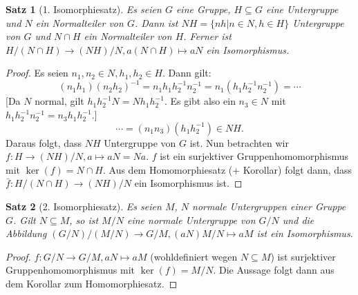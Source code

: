 \documentclass[12pt]{scrartcl} %
\newtheorem{thm}{Satz}[section]
\theoremstyle{definition}
\theoremstyle{remark}
\begin{document}
\begin{thm}[1. Isomorphiesatz]
	Es seien $G$ eine Gruppe, $H \subseteq G$ eine Untergruppe und $N$ ein Normalteiler von $G$.
	Dann ist $NH = \{nh | n \in N, h \in H\}$ Untergruppe von $G$ und $N \cap H$ ein Normalteiler von $H$.
	Ferner ist $H/(N \cap H) \rightarrow (NH)/N, a(N \cap H) \mapsto aN$ ein Isomorphismus.
\end{thm}

\begin{proof}
	Es seien $n_1, n_2 \in N, h_1, h_2 \in H$. Dann gilt:
	$$ (n_1h_1)(n_2h_2)^{-1} = n_1h_1h_2^{-1}n_2^{-1} = n_1(h_1h_2^{-1}n_2^{-1}) = \dotsb $$
	[Da $N$ normal, gilt $h_1h_2^{-1}N = Nh_1h_2^{-1}$.
	Es gibt also ein $n_3 \in N$ mit $h_1h_2^{-1}n_2^{-1} = n_3h_1h_2^{-1}$.]
	$$ \dotsb = (n_1n_3)(h_1h_2^{-1}) \in NH.$$
	Daraus folgt, dass $NH$ Untergruppe von $G$ ist.
	Nun betrachten wir $f: H \rightarrow (NH)/N, a \mapsto aN = Na$.
	$f$ ist ein surjektiver Gruppenhomomorphismus mit $\ker(f) = N \cap H$.
	Aus dem Homomorphiesatz (+ Korollar) folgt dann, dass $\bar{f}: H/(N \cap H) \rightarrow (NH)/N$ ein Isomorphismus ist.
\end{proof}

\begin{thm}[2. Isomorphiesatz]
	Es seien \(M\), \(N\) normale Untergruppen einer Gruppe $G$.
	Gilt $N \subseteq M$, so ist $M/N$ eine normale Untergruppe von $G/N$ und die Abbildung $(G/N)/(M/N) \rightarrow G/M, (aN)M/N \mapsto aM$ ist ein Isomorphismus.
\end{thm}

\begin{proof}
	$f: G/N \rightarrow G/M, aN \mapsto aM$ (wohldefiniert wegen $N \subseteq M$) ist surjektiver Gruppenhomomorphismus mit $\ker(f) = M/N$.
	Die Aussage folgt dann aus dem Korollar zum Homomorphiesatz.
\end{proof}
\end{document}
